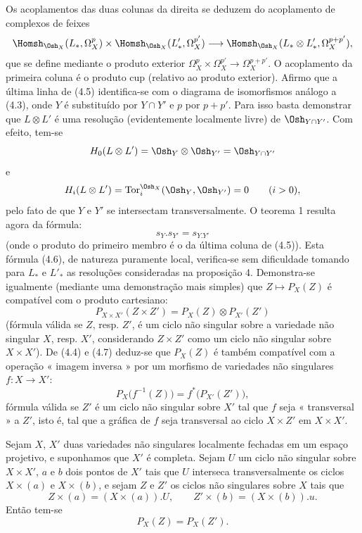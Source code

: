 Os acoplamentos das duas colunas da direita se deduzem do acoplamento de
complexos de feixes
\[
\Homsh_{\Osh_X}(L_{*},\Omega_X^{p})
\times\Homsh_{\Osh_X}(L'_{*},\Omega_X^{p'})
\longrightarrow
\Homsh_{\Osh_X}(L_{*}\otimes L'_{*},\Omega_X^{p+p'}),
\]
que se define mediante o produto exterior
$\Omega_X^{p}\times\Omega_X^{p'}\longrightarrow\Omega_X^{p+p'}$.
O acoplamento da primeira coluna é o produto cup (relativo ao produto
exterior). Afirmo que a última linha de (4.5) identifica-se com o diagrama
de isomorfismos análogo a (4.3), onde $Y$ é substituído por $Y\cap Y'$ e $p$ por
$p+p'$. Para isso basta demonstrar que $L\otimes L'$ é uma resolução
(evidentemente localmente livre) de $\Osh_{Y\cap Y'}$. Com efeito, tem-se
\[
  H_0(L\otimes L')=\Osh_Y\otimes\Osh_{Y'}=\Osh_{Y\cap Y'}
\]
e
\[
  H_i(L\otimes L')=\operatorname{Tor}_{i}^{\Osh_X}(\Osh_Y,\Osh_{Y'})=0
  \qquad(i>0),
\]
pelo fato de que $Y$ e $Y'$ se intersectam transversalmente. O teorema 1 resulta
agora da fórmula:
\begin{equation}\tag{4.6}
  s_Y.s_{Y'}=s_{Y.Y'}
\end{equation}
(onde o produto do primeiro membro é o da última coluna de (4.5)).
Esta fórmula (4.6), de natureza puramente local, verifica-se sem dificuldade
tomando para $L_{*}$ e $L'_{*}$ as resoluções consideradas na proposição
4. Demonstra-se igualmente (mediante uma demonstração mais simples) que
$Z\longmapsto P_X(Z)$ é compatível com o produto cartesiano:
\begin{equation}\tag{4.7}
  P_{X\times X'}(Z\times Z')=P_X(Z)\otimes P_{X'}(Z')
\end{equation}
(fórmula válida se $Z$, resp. $Z'$, é um ciclo não singular sobre a variedade
não singular $X$, resp. $X'$, considerando $Z\times Z'$ como um ciclo não
singular sobre $X\times X'$). De (4.4) e (4.7) deduz-se que $P_X(Z)$ é também
compatível com a operação « imagem inversa » por um morfismo de variedades não
singulares $f:X\longrightarrow X'$:
\begin{equation}\tag{4.8}
  P_X\bigl(f^{-1}(Z)\bigr)=f^{*}\bigl(P_{X'}(Z')\bigr),
\end{equation}
fórmula válida se $Z'$ é um ciclo não singular sobre $X'$ tal que $f$ seja
« transversal » a $Z'$, isto é, tal que a gráfica de $f$ seja transversal ao ciclo
$X\times Z'$ em $X\times X'$.

 Sejam $X$, $X'$ duas variedades não singulares
localmente fechadas em um espaço projetivo, e suponhamos que $X'$ é completa. Sejam $U$
um ciclo não singular sobre $X\times X'$, $a$ e $b$ dois pontos de $X'$ tais que
$U$ interseca transversalmente os ciclos $X\times(a)$ e $X\times(b)$, e sejam $Z$
e $Z'$ os ciclos não singulares sobre $X$ tais que
\[
  Z\times(a)=(X\times(a)).U,
  \qquad
  Z'\times(b)=(X\times(b)).u.
\]
Então tem-se
\[
  P_X(Z)=P_X(Z').
\]

